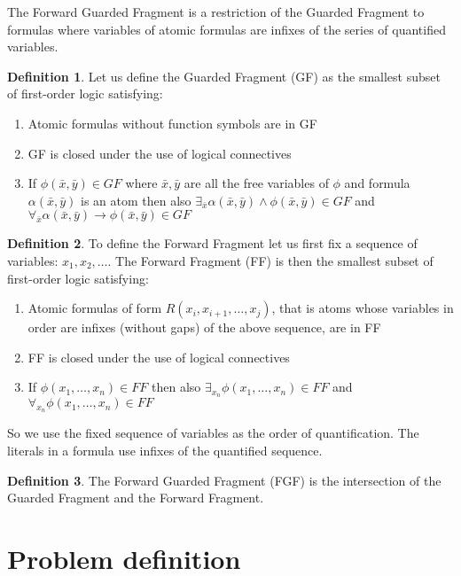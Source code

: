 \documentclass[english, shortabstract]{iithesis}
\theoremstyle{definition} \newtheorem{definition}{Definition}[chapter]
\theoremstyle{remark} \newtheorem{remark}[definition]{Observation}
\theoremstyle{plain} \newtheorem{theorem}[definition]{Theorem}
\theoremstyle{plain} \newtheorem{lemma}[definition]{Lemma}
\begin{document}
The Forward Guarded Fragment is a restriction of the Guarded Fragment to formulas where variables of atomic formulas are infixes of the series of quantified variables. 
\begin{definition}
Let us define the Guarded Fragment (GF) as the smallest subset of first-order logic satisfying:
\begin{enumerate}
    \item Atomic formulas without function symbols are in GF
    \item GF is closed under the use of logical connectives
    \item If $\phi(\bar{x}, \bar{y}) \in \mathit{GF}$ where $\bar{x}, \bar{y}$ are all the free variables of $\phi$ and formula $\alpha(\bar{x},\bar{y})$ is an atom
then also $\exists_{\bar{x}} \alpha(\bar{x}, \bar{y}) \land \phi(\bar{x}, \bar{y}) \in \mathit{GF}$ and $\forall_{\bar{x}} \alpha(\bar{x}, \bar{y}) \rightarrow \phi(\bar{x}, \bar{y}) \in \mathit{GF}$
\end{enumerate}
\end{definition}
\begin{definition}
To define the Forward Fragment let us first fix a sequence of variables: $x_1, x_2, \dots$. The Forward Fragment (FF) is then the smallest subset of first-order logic satisfying:
\begin{enumerate}
    \item Atomic formulas of form $R(x_i, x_{i+1},\dots,x_{j})$, that is atoms whose variables in order are infixes (without gaps) of the above sequence, are in FF
    \item FF is closed under the use of logical connectives
    \item If $\phi(x_1,\dots, x_{n}) \in \mathit{FF}$ then also $\exists_{x_{n}} \phi(x_1,\dots, x_{n}) \in FF$ and $\forall_{x_n} \phi(x_1,\dots, x_{n}) \in \mathit{FF}$
\end{enumerate}
\end{definition}
So we use the fixed sequence of variables as the order of quantification. The literals in a formula use infixes of the quantified sequence.
\begin{definition}
The Forward Guarded Fragment (FGF) is the intersection of the Guarded Fragment and the Forward Fragment.
\end{definition}

\section{Problem definition}
\end{document}
